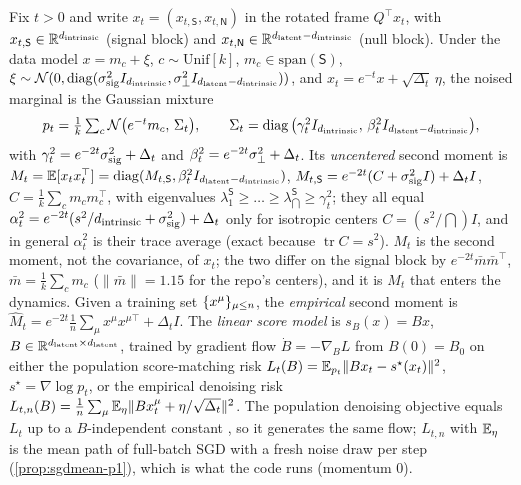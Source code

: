 \begin{definition}\label{def:lin-setting}
Fix $t>0$ and write $x_t=(x_{t,\mathsf S},x_{t,\mathsf N})$ in the rotated frame $Q^{\top}x_t$, with $x_{t,\mathsf S}\in\mathbb{R}^{d_{\mathrm{intrinsic}}}$ (signal block) and $x_{t,\mathsf N}\in\mathbb{R}^{d_{\mathrm{latent}}-d_{\mathrm{intrinsic}}}$ (null block). Under the data model $x=m_c+\xi$, $c\sim\mathrm{Unif}[k]$, $m_c\in\mathrm{span}(\mathsf S)$, $\xi\sim\mathcal N(0,\operatorname{diag}(\sigma_{\mathrm{sig}}^2 I_{d_{\mathrm{intrinsic}}},\sigma_{\perp}^2 I_{d_{\mathrm{latent}}-d_{\mathrm{intrinsic}}}))$, and $x_t=e^{-t}x+\sqrt{\Delta_t}\,\eta$, the noised marginal is the Gaussian mixture
\begin{equation}\label{eq:lin-pt}
p_t=\tfrac1k\textstyle\sum_{c}\mathcal N\big(e^{-t}m_c,\,\Sigma_t\big),\qquad \Sigma_t=\operatorname{diag}\big(\gamma_t^2 I_{d_{\mathrm{intrinsic}}},\,\beta_t^2 I_{d_{\mathrm{latent}}-d_{\mathrm{intrinsic}}}\big),
\end{equation}
with $\gamma_t^2=e^{-2t}\sigma_{\mathrm{sig}}^2+\Delta_t$ and $\beta_t^2=e^{-2t}\sigma_{\perp}^2+\Delta_t$. Its \emph{uncentered} second moment is $M_t=\mathbb{E}[x_tx_t^{\top}]=\operatorname{diag}(M_{t,\mathsf S},\beta_t^2 I_{d_{\mathrm{latent}}-d_{\mathrm{intrinsic}}})$, $M_{t,\mathsf S}=e^{-2t}(C+\sigma_{\mathrm{sig}}^2 I)+\Delta_t I$, $C=\tfrac1k\sum_c m_cm_c^{\top}$, with eigenvalues $\lambda^{\mathsf S}_1\ge\dots\ge\lambda^{\mathsf S}_{\dint}\ge\gamma_t^2$; they all equal $\alpha_t^2=e^{-2t}(s^2/d_{\mathrm{intrinsic}}+\sigma_{\mathrm{sig}}^2)+\Delta_t$ only for isotropic centers $C=(s^2/\dint)I$, and in general $\alpha_t^2$ is their trace average (exact because $\operatorname{tr}C=s^2$). $M_t$ is the second moment, not the covariance, of $x_t$; the two differ on the signal block by $e^{-2t}\bar m\bar m^{\top}$, $\bar m=\frac1k\sum_cm_c$ ($\|\bar m\|=1.15$ for the repo's centers), and it is $M_t$ that enters the dynamics. Given a training set $\{x^\mu\}_{\mu\le n}$, the \emph{empirical} second moment is $\widehat M_t=e^{-2t}\frac1n\sum_\mu x^\mu x^{\mu\top}+\Delta_tI$. The \emph{linear score model} is $s_B(x)=Bx$, $B\in\mathbb{R}^{d_{\mathrm{latent}}\times d_{\mathrm{latent}}}$, trained by gradient flow $\dot B=-\nabla_BL$ from $B(0)=B_0$ on either the population score-matching risk $L_t(B)=\mathbb{E}_{p_t}\|Bx_t-s^\star(x_t)\|^2$, $s^\star=\nabla\log p_t$, or the empirical denoising risk $L_{t,n}(B)=\frac1n\sum_\mu\mathbb{E}_\eta\|Bx^\mu_t+\eta/\sqrt{\Delta_t}\|^2$. The population denoising objective equals $L_t$ up to a $B$-independent constant \citep{vincent2011connection}, so it generates the same flow; $L_{t,n}$ with $\mathbb{E}_\eta$ is the mean path of full-batch SGD with a fresh noise draw per step (\cref{prop:sgdmean-p1}), which is what the code runs (momentum $0$).
\end{definition}

